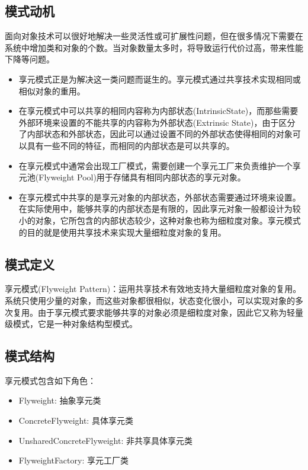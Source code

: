 \documentclass[letterpaper,10pt,english]{sphinxmanual}
\begin{document}
\subsection{模式动机}
\label{\detokenize{structural_patterns/flyweight:id3}}
\sphinxAtStartPar
面向对象技术可以很好地解决一些灵活性或可扩展性问题，但在很多情况下需要在系统中增加类和对象的个数。当对象数量太多时，将导致运行代价过高，带来性能下降等问题。
\begin{itemize}
\item {} 
\sphinxAtStartPar
享元模式正是为解决这一类问题而诞生的。享元模式通过共享技术实现相同或相似对象的重用。

\item {} 
\sphinxAtStartPar
在享元模式中可以共享的相同内容称为内部状态(IntrinsicState)，而那些需要外部环境来设置的不能共享的内容称为外部状态(Extrinsic State)，由于区分了内部状态和外部状态，因此可以通过设置不同的外部状态使得相同的对象可以具有一些不同的特征，而相同的内部状态是可以共享的。

\item {} 
\sphinxAtStartPar
在享元模式中通常会出现工厂模式，需要创建一个享元工厂来负责维护一个享元池(Flyweight Pool)用于存储具有相同内部状态的享元对象。

\item {} 
\sphinxAtStartPar
在享元模式中共享的是享元对象的内部状态，外部状态需要通过环境来设置。在实际使用中，能够共享的内部状态是有限的，因此享元对象一般都设计为较小的对象，它所包含的内部状态较少，这种对象也称为细粒度对象。享元模式的目的就是使用共享技术来实现大量细粒度对象的复用。

\end{itemize}


\subsection{模式定义}
\label{\detokenize{structural_patterns/flyweight:id4}}
\sphinxAtStartPar
享元模式(Flyweight Pattern)：运用共享技术有效地支持大量细粒度对象的复用。系统只使用少量的对象，而这些对象都很相似，状态变化很小，可以实现对象的多次复用。由于享元模式要求能够共享的对象必须是细粒度对象，因此它又称为轻量级模式，它是一种对象结构型模式。


\subsection{模式结构}
\label{\detokenize{structural_patterns/flyweight:id5}}
\sphinxAtStartPar
享元模式包含如下角色：
\begin{itemize}
\item {} 
\sphinxAtStartPar
Flyweight: 抽象享元类

\item {} 
\sphinxAtStartPar
ConcreteFlyweight: 具体享元类

\item {} 
\sphinxAtStartPar
UnsharedConcreteFlyweight: 非共享具体享元类

\item {} 
\sphinxAtStartPar
FlyweightFactory: 享元工厂类

\end{itemize}
\end{document}
